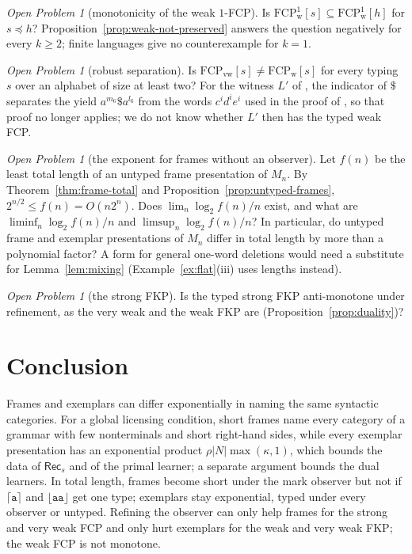 \documentclass[11pt]{article}
\numberwithin{equation}{section}
\theoremstyle{plain}
\theoremstyle{definition}
\theoremstyle{remark}
\newtheorem{openproblem}[theorem]{Open Problem}
\theoremstyle{plain}
\newcommand{\tFCP}[3]{\mathrm{FCP}^{#1}_{\mathrm{#2}}[#3]}
\newcommand{\Lfl}{\lfloor}
\newcommand{\Rfl}{\rfloor}
\newcommand{\Lce}{\lceil}
\newcommand{\Rce}{\rceil}
\newcommand{\ta}{\mathtt a}
\begin{document}
\begin{openproblem}[monotonicity of the weak $1$-FCP]\label{op:weak-fcp}
Is $\tFCP1{w}{s}\subseteq\tFCP1{w}{h}$ for $s\preceq h$?
Proposition~\ref{prop:weak-not-preserved} answers the question negatively
for every $k\ge2$; finite languages give no counterexample for $k=1$.
\end{openproblem}

\begin{openproblem}[robust separation]\label{op:robust}
Is $\tFCP{}{vw}{s}\ne\tFCP{}{w}{s}$ for every typing $s$ over an alphabet of
size at least two?  For the witness $L'$ of \citet[Thm.~14]{ky2017}, the
indicator of $\$$ separates the yield $a^{m_6}\$a^{l_6}$ from the words
$c^id^ie^i$ used in the proof of \citet[Lemma~13]{ky2017}, so that proof no
longer applies; we do not know whether $L'$ then has the typed weak FCP.
\end{openproblem}

\begin{openproblem}[the exponent for frames without an observer]\label{op:frame-exponent}
Let $f(n)$ be the least total length of an untyped frame presentation of
$M_n$.  By Theorem~\ref{thm:frame-total} and
Proposition~\ref{prop:untyped-frames}, $2^{n/2}\le f(n)=O(n2^n)$.  Does
$\lim_n\log_2f(n)/n$ exist, and what are $\liminf_n\log_2f(n)/n$ and
$\limsup_n\log_2f(n)/n$?  In particular, do untyped frame and exemplar
presentations of $M_n$ differ in total length by more than a polynomial
factor?  A form for general one-word deletions would need a substitute for
Lemma~\ref{lem:mixing} (Example~\ref{ex:flat}(iii) uses lengths instead).
\end{openproblem}

\begin{openproblem}[the strong FKP]\label{op:further}
Is the typed strong FKP anti-monotone under refinement, as the very weak
and the weak FKP are (Proposition~\ref{prop:duality})?
\end{openproblem}

\section{Conclusion}\label{sec:conclusion}
Frames and exemplars can differ exponentially in naming the same syntactic
categories.  For a global licensing condition, short frames name every
category of a grammar with few nonterminals and short right-hand sides,
while every exemplar presentation has an exponential product
$\rho|N|\max(\kappa,1)$, which bounds the data of $\mathsf{Rec}_s$ and of the
primal learner; a separate argument bounds the dual learners.  In total
length, frames become short under the mark observer but not if $\Lce\ta\Rce$
and $\Lfl\ta\ta\Rfl$ get one type; exemplars stay exponential, typed under
every observer or untyped.  Refining the
observer can only help frames for the strong and very weak FCP and only hurt
exemplars for the weak and very weak FKP; the weak FCP is not monotone.
\end{document}
